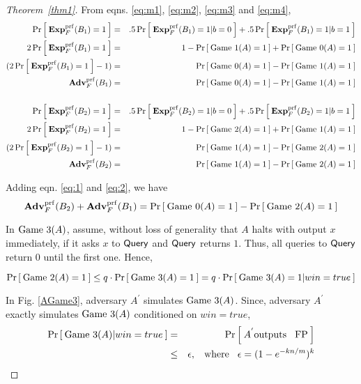 \begin{proof}[Theorem~\ref{thm1}]
From eqns. \ref{eq:m1}, \ref{eq:m2}, \ref{eq:m3} and \ref{eq:m4},
\begin{eqnarray}
\nonumber \Pr\left[\: \mathbf{Exp}^{\mathrm{prf}}_{F}(B_1) = 1 \:\right] &=& .5\Pr\left[\: \mathbf{Exp}^{\mathrm{prf}}_{F}(B_1)=1|b=0 \:\right] + .5\Pr\left[\: \mathbf{Exp}^{\mathrm{prf}}_{F}(B_1) = 1|b=1 \:\right]\\
\nonumber 2\Pr\left[\: \mathbf{Exp}^{\mathrm{prf}}_{F}(B_1) = 1 \:\right] &=& 1-\Pr\left[\: \text{Game 1}(A)=1 \:\right] + \Pr\left[\: \text{Game 0}(A)=1 \:\right]\\
\nonumber (2\Pr\left[\: \mathbf{Exp}^{\mathrm{prf}}_{F}(B_1) = 1 \:\right] - 1)  &=& \Pr\left[\: \text{Game 0}(A)=1 \:\right] - \Pr\left[\: \text{Game 1}(A)=1 \:\right]\\
 \mathbf{Adv}^{\mathrm{prf}}_{F}(B_1) &=& \Pr\left[\: \text{Game 0}(A)=1 \:\right] - \Pr\left[\: \text{Game 1}(A)=1 \:\right] \label{eq:1}\\
\nonumber& &\\
\nonumber \Pr\left[\: \mathbf{Exp}^{\mathrm{prf}}_{F}(B_2) = 1 \:\right] &=& .5\Pr\left[\: \mathbf{Exp}^{\mathrm{prf}}_{F}(B_2)=1|b=0 \:\right] + .5\Pr\left[\: \mathbf{Exp}^{\mathrm{prf}}_{F}(B_2) = 1|b=1 \:\right]\\
\nonumber 2\Pr\left[\: \mathbf{Exp}^{\mathrm{prf}}_{F}(B_2) = 1 \:\right] &=& 1-\Pr\left[\: \text{Game 2}(A)=1 \:\right] + \Pr\left[\: \text{Game 1}(A)=1 \:\right]\\
\nonumber (2\Pr\left[\: \mathbf{Exp}^{\mathrm{prf}}_{F}(B_2) = 1 \:\right] - 1)  &=& \Pr\left[\: \text{Game 1}(A)=1 \:\right] - \Pr\left[\: \text{Game 2}(A)=1 \:\right]\\
 \mathbf{Adv}^{\mathrm{prf}}_{F}(B_2) &=& \Pr\left[\: \text{Game 1}(A)=1 \:\right] - \Pr\left[\: \text{Game 2}(A)=1 \:\right] \label{eq:2}
\end{eqnarray}

Adding eqn. \ref{eq:1} and \ref{eq:2}, we have
\begin{equation}
\mathbf{Adv}^{\mathrm{prf}}_{F}(B_2) +\mathbf{Adv}^{\mathrm{prf}}_{F}(B_1) = \Pr\left[\: \text{Game 0}(A)=1 \:\right] - \Pr\left[\: \text{Game 2}(A)=1 \:\right]\label{eq:2a}
\end{equation}

In $\text{Game 3}(A)$, assume, without loss of generality that $A$ halts with output $x$ immediately, if it asks $x$ to $\mathsf{Query}$ and $\mathsf{Query}$ returns $1$. Thus, all queries to $\mathsf{Query}$ return 0 until the first one. Hence,

\begin{equation}
\Pr\left[\: \text{Game 2}(A)=1 \:\right] \leq q \cdot \Pr\left[\: \text{Game 3}(A)=1 \:\right] = q \cdot \Pr\left[\: \text{Game 3}(A)=1|win=true \:\right]\label{eq:3}
\end{equation}

In Fig. \ref{AGame3}, adversary $A^{'}$ simulates $\text{Game 3}(A)$. Since, adversary $A^{'}$ exactly simulates $\text{Game 3}(A)$ conditioned on $win = true$, 
\begin{eqnarray}
\nonumber \Pr\left[\: \text{Game 3}(A)|win=true \:\right] &=& \Pr\left[\: A^{'} \mathrm{outputs \hspace*{2ex} FP} \:\right]\\
& \leq & \epsilon, \hspace*{2ex} \mathrm{where} \hspace*{2ex} \epsilon = (1-e^{-kn/m})^k\label{eq:4}
\end{eqnarray}


\end{proof}
